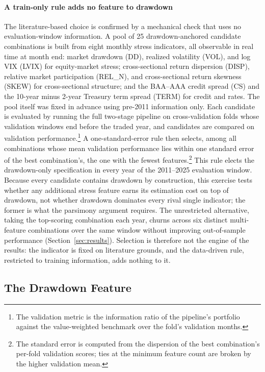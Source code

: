 \paragraph{A train-only rule adds no feature to drawdown}
The literature-based choice is confirmed by a mechanical check that uses no evaluation-window information. A pool of 25 drawdown-anchored candidate combinations is built from eight monthly stress indicators, all observable in real time at month end: market drawdown (DD), realized volatility (VOL), and log VIX (LVIX) for equity-market stress; cross-sectional return dispersion (DISP), relative market participation (REL\_N), and cross-sectional return skewness (SKEW) for cross-sectional structure; and the BAA--AAA credit spread (CS) and the 10-year minus 2-year Treasury term spread (TERM) for credit and rates. The pool itself was fixed in advance using pre-2011 information only. Each candidate is evaluated by running the full two-stage pipeline on cross-validation folds whose validation windows end before the traded year, and candidates are compared on validation performance.\footnote{The validation metric is the information ratio of the pipeline's portfolio against the value-weighted benchmark over the fold's validation months.} A one-standard-error rule then selects, among all combinations whose mean validation performance lies within one standard error of the best combination's, the one with the fewest features.\footnote{The standard error is computed from the dispersion of the best combination's per-fold validation scores; ties at the minimum feature count are broken by the higher validation mean.} This rule elects the drawdown-only specification in every year of the 2011--2025 evaluation window. Because every candidate contains drawdown by construction, this exercise tests whether any additional stress feature earns its estimation cost on top of drawdown, not whether drawdown dominates every rival single indicator; the former is what the parsimony argument requires. The unrestricted alternative, taking the top-scoring combination each year, churns across six distinct multi-feature combinations over the same window without improving out-of-sample performance (Section~\ref{sec:results}). Selection is therefore not the engine of the results: the indicator is fixed on literature grounds, and the data-driven rule, restricted to training information, adds nothing to it.

\subsection{The Drawdown Feature}\label{sec:hmm_features}

